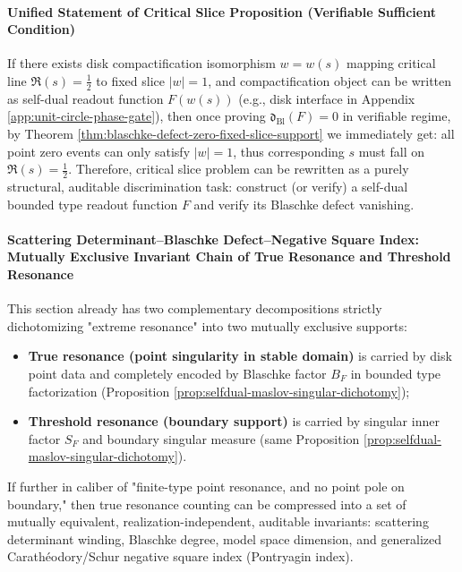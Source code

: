 \paragraph{Unified Statement of Critical Slice Proposition (Verifiable Sufficient Condition)}
If there exists disk compactification isomorphism \(w=w(s)\) mapping critical line \(\Re(s)=\tfrac12\) to fixed slice \(|w|=1\), and compactification object can be written as self-dual readout function \(F(w(s))\) (e.g., disk interface in Appendix \ref{app:unit-circle-phase-gate}),
then once proving \(\mathfrak{d}_{\mathrm{Bl}}(F)=0\) in verifiable regime, by Theorem \ref{thm:blaschke-defect-zero-fixed-slice-support} we immediately get: all point zero events can only satisfy \(|w|=1\), thus corresponding \(s\) must fall on \(\Re(s)=\tfrac12\).
Therefore, critical slice problem can be rewritten as a purely structural, auditable discrimination task: construct (or verify) a self-dual bounded type readout function \(F\) and verify its Blaschke defect vanishing.

\paragraph{Scattering Determinant–Blaschke Defect–Negative Square Index: Mutually Exclusive Invariant Chain of True Resonance and Threshold Resonance}\label{par:selfdual-scattering-blaschke-neg-square-chain}
This section already has two complementary decompositions strictly dichotomizing "extreme resonance" into two mutually exclusive supports:
\begin{itemize}
  \item \textbf{True resonance (point singularity in stable domain)} is carried by disk point data and completely encoded by Blaschke factor \(B_F\) in bounded type factorization (Proposition \ref{prop:selfdual-maslov-singular-dichotomy});
  \item \textbf{Threshold resonance (boundary support)} is carried by singular inner factor \(S_F\) and boundary singular measure (same Proposition \ref{prop:selfdual-maslov-singular-dichotomy}).
\end{itemize}
If further in caliber of "finite-type point resonance, and no point pole on boundary," then true resonance counting can be compressed into a set of mutually equivalent, realization-independent, auditable invariants: scattering determinant winding, Blaschke degree, model space dimension, and generalized Carathéodory/Schur negative square index (Pontryagin index).

